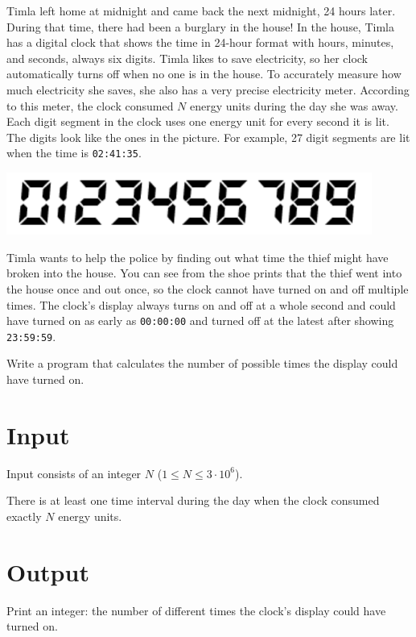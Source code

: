 
Timla left home at midnight and came back the next midnight, 24 hours later. During that time,
there had been a burglary in the house! 
In the house, Timla has a digital clock that shows the time in 24-hour format with hours,
minutes, and seconds, always six digits. Timla likes to save electricity, so her clock automatically
turns off when no one is in the house. 
To accurately measure how much electricity she saves, she also has a very precise electricity meter.
According to this meter, the clock consumed $N$ energy units during the day she was away. 
Each digit segment in the clock uses one energy unit for every second it is lit. The digits look like
the ones in the picture. For example, 27 digit segments are lit when the time is \texttt{02:41:35}.

\begin{center}
  \includegraphics[width=12cm]{illustration.png}
\end{center}


Timla wants to help the police by finding out what time the thief might have broken into the house.
You can see from the shoe prints that the thief went into the house once and out once, so the clock
cannot have turned on and off multiple times. The clock's display always turns on and off at a whole
second and could have turned on as early as \texttt{00:00:00} and turned off at the latest after showing \texttt{23:59:59}.

Write a program that calculates the number of possible times the display could have turned on.

\section*{Input}
Input consists of an integer $N$ ($1 \leq N \leq 3 \cdot 10^6$).

There is at least one time interval during the day when the clock consumed exactly $N$ energy units.

\section*{Output}
Print an integer: the number of different times the clock's display could have turned on.

